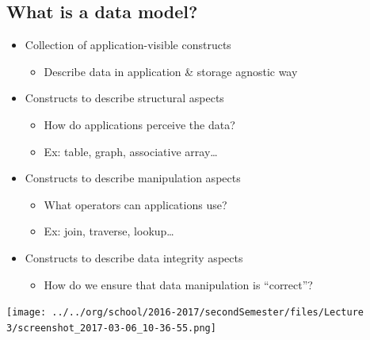 \documentclass[11pt]{article}
\begin{document}
\subsection{What is a data model?}
\label{sec:org0607429}
\begin{itemize}
\item Collection of application-visible constructs
\begin{itemize}
\item Describe data in application \& storage agnostic way
\end{itemize}
\item Constructs to describe structural aspects
\begin{itemize}
\item How do applications perceive the data?
\item Ex: table, graph, associative array\ldots{}
\end{itemize}
\item Constructs to describe manipulation aspects
\begin{itemize}
\item What operators can applications use?
\item Ex: join, traverse, lookup\ldots{}
\end{itemize}
\item Constructs to describe data integrity aspects
\begin{itemize}
\item How do we ensure that data manipulation is “correct”?
\end{itemize}
\end{itemize}
\begin{center}
\texttt{[image: ../../org/school/2016-2017/secondSemester/files/Lecture 3/screenshot\_2017-03-06\_10-36-55.png]}
\end{center}
\end{document}
